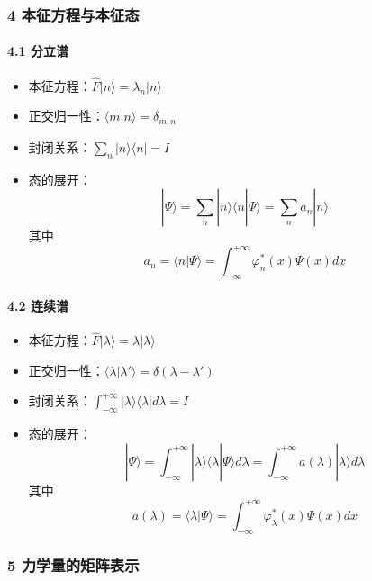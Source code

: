 \documentclass[UTF8,twocolumn]{ctexart}
\providecommand{\tightlist}{%
  \setlength{\itemsep}{0pt}\setlength{\parskip}{0pt}}
\let\oldparagraph\paragraph
\renewcommand{\paragraph}[1]{\oldparagraph{#1}\mbox{}}
\begin{document}
\hypertarget{ux672cux5f81ux65b9ux7a0bux4e0eux672cux5f81ux6001}{%
\subsubsection{4
本征方程与本征态}\label{ux672cux5f81ux65b9ux7a0bux4e0eux672cux5f81ux6001}}

\hypertarget{ux5206ux7acbux8c31}{%
\paragraph{ 4.1 分立谱}\label{ux5206ux7acbux8c31}}

\begin{itemize}
\tightlist
\item
  本征方程：\(\hat{F}|n\rangle=\lambda_n|n\rangle\)
\item
  正交归一性：\(\langle m|n\rangle=\delta_{m,n}\)
\item
  封闭关系：\(\sum_n|n\rangle\langle n|=I\)
\item
  态的展开：
  \[|\Psi\rangle=\sum_n|n\rangle\langle n|\Psi\rangle=\sum_na_n|n\rangle\]
  其中
  \[a_n=\langle n|\Psi\rangle=\int_{-\infty}^{+\infty}\varphi^*_n(x)\Psi(x)dx\]
\end{itemize}

\hypertarget{ux8fdeux7eedux8c31}{%
\paragraph{ 4.2 连续谱}\label{ux8fdeux7eedux8c31}}

\begin{itemize}
\tightlist
\item
  本征方程：\(\hat{F}|\lambda\rangle=\lambda|\lambda\rangle\)
\item
  正交归一性：\(\langle\lambda|\lambda'\rangle=\delta(\lambda-\lambda')\)
\item
  封闭关系：\(\int_{-\infty}^{+\infty}|\lambda\rangle\langle\lambda|d\lambda=I\)
\item
  态的展开：\[|\Psi\rangle=\int_{-\infty}^{+\infty}|\lambda\rangle\langle\lambda|\Psi\rangle d\lambda=\int_{-\infty}^{+\infty}a(\lambda)|\lambda\rangle d\lambda\]
  其中
  \[a(\lambda)=\langle\lambda|\Psi\rangle=\int_{-\infty}^{+\infty}\varphi^*_{\lambda}(x)\Psi(x)dx\]
\end{itemize}

\hypertarget{ux529bux5b66ux91cfux7684ux77e9ux9635ux8868ux793a}{%
\subsubsection{5
力学量的矩阵表示}\label{ux529bux5b66ux91cfux7684ux77e9ux9635ux8868ux793a}}
\end{document}
